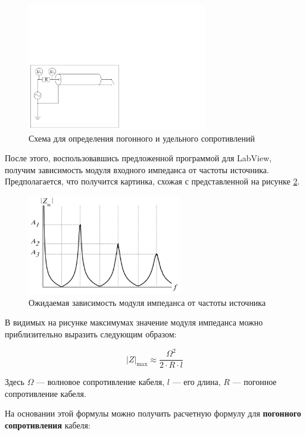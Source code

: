 \documentclass[a4paper, 12pt]{article}
\begin{document}
\begin{figure}[H]
	\centering
	\includegraphics[width=0.7\textwidth]{Long_lines_circuit_2}
	\caption{Схема для определения погонного и удельного сопротивлений}
	\label{fig:circuit_rho}
\end{figure}

После этого, воспользовавшись предложенной программой для LabView, получим зависимость модуля входного импеданса от частоты источника. Предполагается, что получится картинка, схожая с представленной на рисунке \ref{fig:Impedance_theor}.

\begin{figure}[H]
	\centering
	\includegraphics[width=0.6\textwidth]{Impedance_theor}
	\caption{Ожидаемая зависимость модуля импеданса от частоты источника}
	\label{fig:Impedance_theor}
\end{figure}

В видимых на рисунке максимумах значение модуля импеданса можно приблизительно выразить следующим образом:

\begin{equation*}
	|Z|_{\text{max}} \approx \frac{\Omega^2}{2 \cdot R \cdot l}
\end{equation*}

Здесь $\Omega$ --- волновое сопротивление кабеля, $l$ --- его длина, $R$ --- погонное сопротивление кабеля.

На основании этой формулы можно получить расчетную формулу для \textbf{погонного сопротивления} кабеля:
\end{document}
